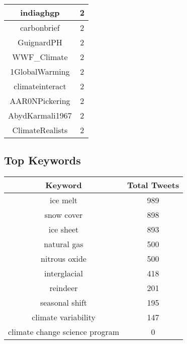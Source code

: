 \documentclass{article}\usepackage[T1]{fontenc}
\begin{document}
\begin{tabular}{|c|c|}
indiaghgp & 2\\ 
 \hline
carbonbrief & 2\\ 
 \hline
GuignardPH & 2\\ 
 \hline
WWF\_Climate & 2\\ 
 \hline
1GlobalWarming & 2\\ 
 \hline
climateinteract & 2\\ 
 \hline
AAR0NPickering & 2\\ 
 \hline
AbydKarmali1967 & 2\\ 
 \hline
ClimateRealists & 2\\ 
 \hline
\end{tabular}\subsection*{Top Keywords}\begin{tabular}{|c|c|}         \hline         Keyword & Total Tweets \\ 
 \hline
ice melt & 989\\ 
 \hline
snow cover & 898\\ 
 \hline
ice sheet & 893\\ 
 \hline
natural gas & 500\\ 
 \hline
nitrous oxide & 500\\ 
 \hline
interglacial & 418\\ 
 \hline
reindeer & 201\\ 
 \hline
seasonal shift & 195\\ 
 \hline
climate variability & 147\\ 
 \hline
climate change science program & 0\\ 
 \hline
\end{tabular}
\end{document}
